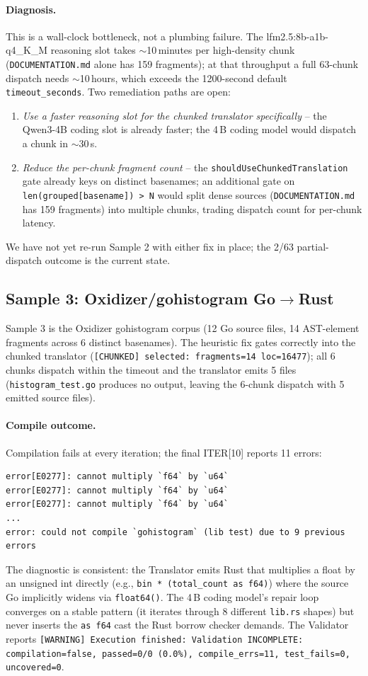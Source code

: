 \paragraph{Diagnosis.}
This is a wall-clock bottleneck, not a plumbing failure. The
lfm2.5:8b-a1b-q4\_K\_M reasoning slot takes $\sim$10\,minutes per
high-density chunk (\texttt{DOCUMENTATION.md} alone has 159
fragments); at that throughput a full 63-chunk dispatch needs
$\sim$10\,hours, which exceeds the 1200-second default
\texttt{timeout\_seconds}. Two remediation paths are open:
\begin{enumerate}
\item \emph{Use a faster reasoning slot for the chunked translator
specifically} -- the Qwen3-4B coding slot is already faster; the
4\,B coding model would dispatch a chunk in $\sim$30\,s.
\item \emph{Reduce the per-chunk fragment count} -- the
\texttt{shouldUseChunkedTranslation} gate already keys on distinct
basenames; an additional gate on
\texttt{len(grouped[basename]) > N} would split dense sources
(\texttt{DOCUMENTATION.md} has 159 fragments) into multiple
chunks, trading dispatch count for per-chunk latency.
\end{enumerate}
We have not yet re-run Sample 2 with either fix in place; the
2/63 partial-dispatch outcome is the current state.

\subsection{Sample 3: Oxidizer/gohistogram Go$\rightarrow$Rust}

Sample 3 is the Oxidizer gohistogram corpus (12 Go source files,
14 AST-element fragments across 6 distinct basenames). The
heuristic fix gates correctly into the chunked translator
(\texttt{[CHUNKED] selected: fragments=14 loc=16477}); all 6 chunks
dispatch within the timeout and the translator emits 5 files
(\texttt{histogram\_test.go} produces no output, leaving the
6-chunk dispatch with 5 emitted source files).

\paragraph{Compile outcome.}
Compilation fails at every iteration; the final ITER[10]
reports 11 errors:
\begin{verbatim}
error[E0277]: cannot multiply `f64` by `u64`
error[E0277]: cannot multiply `f64` by `u64`
error[E0277]: cannot multiply `f64` by `u64`
...
error: could not compile `gohistogram` (lib test) due to 9 previous errors
\end{verbatim}
The diagnostic is consistent: the Translator emits Rust that
multiplies a float by an unsigned int directly (e.g.,
\texttt{bin * (total\_count as f64)}) where the source Go
implicitly widens via \texttt{float64()}. The 4\,B coding model's
repair loop converges on a stable pattern (it iterates through 8
different \texttt{lib.rs} shapes) but never inserts the
\texttt{as f64} cast the Rust borrow checker demands. The
Validator reports \texttt{[WARNING] Execution finished: Validation
INCOMPLETE: compilation=false, passed=0/0 (0.0\%), compile\_errs=11,
test\_fails=0, uncovered=0}.

